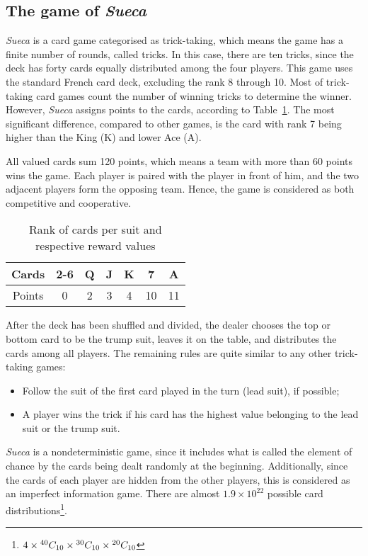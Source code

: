 \subsection{The game of \emph{Sueca}}

\emph{Sueca} is a card game categorised as trick-taking, which means the game has a finite number of rounds, called tricks.
In this case, there are ten tricks, since the deck has forty cards equally distributed among the four players.
This game uses the standard French card deck, excluding the rank 8 through 10.
Most of trick-taking card games count the number of winning tricks to determine the winner.
However, \emph{Sueca} assigns points to the cards, according to Table~\ref{tab:points-table}.
The most significant difference, compared to other games, is the card with rank 7 being higher than the King (K) and lower Ace (A).


All valued cards sum 120 points, which means a team with more than 60 points wins the game.
Each player is paired with the player in front of him, and the two adjacent players form the opposing team.
Hence, the game is considered as both competitive and cooperative.

\begin{table}[ht]
\centering
\caption{Rank of cards per suit and respective reward values}
\begin{tabular}{|c|c|c|c|c|c|c|}
\hline
Cards  & 2-6 & Q & J & K & 7  & A  \\ \hline
Points & 0   & 2 & 3 & 4 & 10 & 11 \\ \hline
\end{tabular}
\label{tab:points-table}
\end{table}

After the deck has been shuffled and divided, the dealer chooses the top or bottom card to be the trump suit, leaves it on the table, and distributes the cards among all players.
The remaining rules are quite similar to any other trick-taking games:
\begin{itemize}
\item Follow the suit of the first card played in the turn (lead suit), if possible;
\item A player wins the trick if his card has the highest value belonging to the lead suit or the trump suit.
\end{itemize}


\emph{Sueca} is a nondeterministic game, since it includes what is called the element of chance by the cards being dealt randomly at the beginning.
Additionally, since the cards of each player are hidden from the other players, this is considered as an imperfect information game.
There are almost $1.9\times10^{22}$ possible card distributions\footnote{$4\times{}^{40}C_{10}\times{}^{30}C_{10}\times{}^{20}C_{10}$}.
